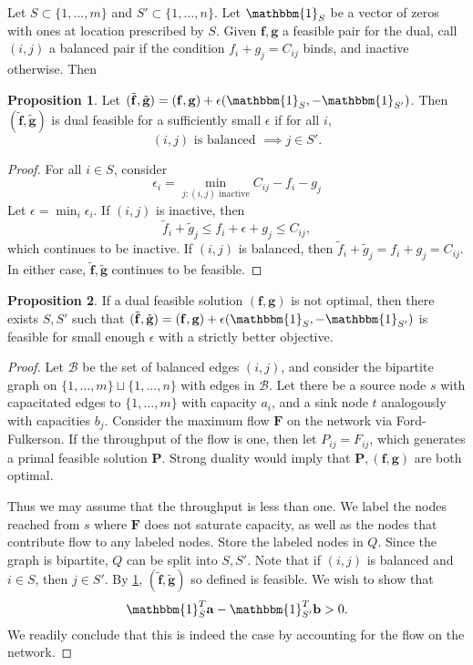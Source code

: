 \documentclass[11pt,reqno]{amsart}
\newcommand{\one}{\mathbbm{1}}
\renewcommand{\b}{\mathbf}
\theoremstyle{definition}
\newtheorem{prop}{Proposition}
\theoremstyle{remark}
\begin{document}
Let $S \subset \{1,\ldots,m\}$ and $S' \subset \{1,\ldots,n\}.$ Let $\one_S$
be a vector of zeros with ones at location prescribed by $S$. Given $\b f,
\b g$ a feasible pair for the dual, call $(i,j)$ a balanced pair if the
condition $f_i + g_j = C_{ij}$
binds, and inactive otherwise. Then 
\begin{prop}

    Let $(\tilde {\b f}, \tilde {\b g}) = (\b f, \b g) + \epsilon (\one_S,
    -\one_{S'})$. Then $(\tilde {\b f}, \tilde {\b g})$ is dual feasible for
    a sufficiently small $\epsilon$ if for all $i$, \[
    (i,j) \text{ is balanced } \implies \text{$j \in S'$}.
    \]
\label{prop:feasible}
\end{prop}
\begin{proof}
    For all $i\in S$, consider \[
    \epsilon_i = \min_{j: (i,j) \text{ inactive}} C_{ij} - f_i - g_j
    \]
    Let $\epsilon = \min_i \epsilon_i$. If $(i,j)$ is inactive, then \[
    \tilde f_i + \tilde g_j \le f_i + \epsilon + g_j\le C_{ij},
    \]
    which continues to be inactive. If $(i,j)$ is balanced, then $\tilde
    f_i + \tilde g_j = f_i + g_j = C_{ij}$. In either case, $\tilde {\b f},
    \tilde {\b g}$ continues to be feasible.
\end{proof}

\begin{prop}
\label{prop:dualascent}
    If a dual feasible solution $(\b f, \b g)$ is not optimal, then there
    exists $S,S'$ such that $(\tilde {\b f}, \tilde {\b g}) = (\b f, \b g) + \epsilon (\one_S,
    -\one_{S'})$ is feasible for small enough $\epsilon$ with a strictly
    better objective.
\end{prop}

\begin{proof}
    Let $\mathcal B$ be the set of balanced edges $(i,j)$, and consider the
    bipartite graph on $\{1,\ldots,m\} \sqcup \{1,\ldots,n\}$ with edges in
    $\mathcal B$. Let there be a source node $s$ with capacitated edges to
    $\{1,\ldots,m\}$ with capacity $a_i$, and a sink node $t$ analogously
    with capacities $b_j$. Consider the maximum flow $\b F$ on the network
    via Ford-Fulkerson. If the throughput of the flow is one, then let $P_
    {ij} = F_{ij}$, which generates a primal feasible solution $\b P$.
    Strong duality would imply that $\b P, (\b f, \b g)$ are both optimal.
    
    Thus we may assume that the throughput is less than one. We label the
    nodes reached from $s$ where $\b F$ does not saturate capacity, as well
    as the nodes that contribute flow to any labeled nodes. Store the
    labeled nodes in $Q$. Since the graph is bipartite, $Q$ can be split
    into $S,S'$. Note that if $(i,j)$ is balanced and $i\in S$, then $j\in
    S'$. By \cref{prop:feasible}, $(\tilde {\b f}, \tilde {\b g})$ so
    defined is feasible. We wish to show that \[
    \one_S^T \b a - \one_{S'}^T \b b > 0.
    \]
    We readily conclude that this is indeed the case by accounting for the
    flow on the network.
\end{proof}
\end{document}
